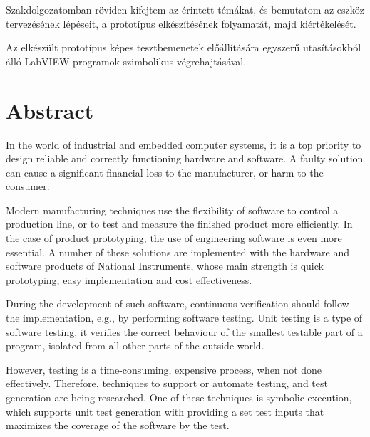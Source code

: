 Szakdolgozatomban röviden kifejtem az érintett témákat, és bemutatom az eszköz tervezésének lépéseit, a prototípus elkészítésének folyamatát, majd kiértékelését.

Az elkészült prototípus képes tesztbemenetek előállítására egyszerű utasításokból álló LabVIEW programok szimbolikus végrehajtásával.
\vfill
\selectenglish


\chapter*{Abstract}


In the world of industrial and embedded computer systems, it is a top priority to design reliable and correctly functioning hardware and software. A faulty solution can cause a significant financial loss to the manufacturer, or harm to the consumer. 

Modern manufacturing techniques use the flexibility of software to control a production line, or to test and measure the finished product more efficiently. In the case of product prototyping, the use of engineering software is even more essential. A number of these solutions are implemented with the hardware and software products of National Instruments, whose main strength is quick prototyping, easy implementation and cost effectiveness.

During the development of such software, continuous verification should follow the implementation, e.g., by performing software testing. Unit testing is a type of software testing, it verifies the correct behaviour of the smallest testable part of a program, isolated from all other parts of the outside world.

However, testing is a time-consuming, expensive process, when not done effectively. Therefore, techniques to support or automate testing, and test generation are being researched. One of these techniques is symbolic execution, which supports unit test generation with providing a set test inputs that maximizes the coverage of the software by the test.

